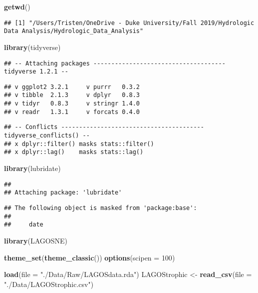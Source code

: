 \documentclass[]{article}
\newenvironment{Shaded}{\begin{snugshade}}{\end{snugshade}}
\newcommand{\DataTypeTok}[1]{\textcolor[rgb]{0.13,0.29,0.53}{#1}}
\newcommand{\DecValTok}[1]{\textcolor[rgb]{0.00,0.00,0.81}{#1}}
\newcommand{\KeywordTok}[1]{\textcolor[rgb]{0.13,0.29,0.53}{\textbf{#1}}}
\newcommand{\NormalTok}[1]{#1}
\newcommand{\StringTok}[1]{\textcolor[rgb]{0.31,0.60,0.02}{#1}}
\begin{document}
\begin{Shaded}
\begin{Highlighting}[]
\KeywordTok{getwd}\NormalTok{()}
\end{Highlighting}
\end{Shaded}

\begin{verbatim}
## [1] "/Users/Tristen/OneDrive - Duke University/Fall 2019/Hydrologic Data Analysis/Hydrologic_Data_Analysis"
\end{verbatim}

\begin{Shaded}
\begin{Highlighting}[]
\KeywordTok{library}\NormalTok{(tidyverse)}
\end{Highlighting}
\end{Shaded}

\begin{verbatim}
## -- Attaching packages ------------------------------------- tidyverse 1.2.1 --
\end{verbatim}

\begin{verbatim}
## v ggplot2 3.2.1     v purrr   0.3.2
## v tibble  2.1.3     v dplyr   0.8.3
## v tidyr   0.8.3     v stringr 1.4.0
## v readr   1.3.1     v forcats 0.4.0
\end{verbatim}

\begin{verbatim}
## -- Conflicts ---------------------------------------- tidyverse_conflicts() --
## x dplyr::filter() masks stats::filter()
## x dplyr::lag()    masks stats::lag()
\end{verbatim}

\begin{Shaded}
\begin{Highlighting}[]
\KeywordTok{library}\NormalTok{(lubridate)}
\end{Highlighting}
\end{Shaded}

\begin{verbatim}
## 
## Attaching package: 'lubridate'
\end{verbatim}

\begin{verbatim}
## The following object is masked from 'package:base':
## 
##     date
\end{verbatim}

\begin{Shaded}
\begin{Highlighting}[]
\KeywordTok{library}\NormalTok{(LAGOSNE)}

\KeywordTok{theme_set}\NormalTok{(}\KeywordTok{theme_classic}\NormalTok{())}
\KeywordTok{options}\NormalTok{(}\DataTypeTok{scipen =} \DecValTok{100}\NormalTok{)}

\KeywordTok{load}\NormalTok{(}\DataTypeTok{file =} \StringTok{"./Data/Raw/LAGOSdata.rda"}\NormalTok{)}
\NormalTok{LAGOStrophic <-}\StringTok{ }\KeywordTok{read_csv}\NormalTok{(}\DataTypeTok{file =} \StringTok{"./Data/LAGOStrophic.csv"}\NormalTok{)}
\end{Highlighting}
\end{Shaded}
\end{document}
